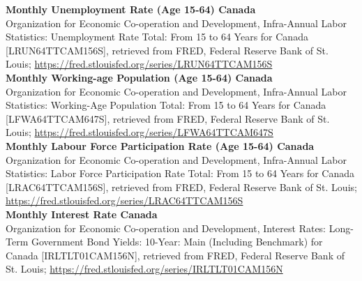 \documentclass[]{article}
\begin{document}
\noindent
\textbf{Monthly Unemployment Rate (Age 15-64) Canada}\\
\indent
Organization for Economic Co-operation and Development, Infra-Annual Labor Statistics: Unemployment Rate Total: From 15 to 64 Years for Canada [LRUN64TTCAM156S], retrieved from FRED, Federal Reserve Bank of St. Louis; \url{https://fred.stlouisfed.org/series/LRUN64TTCAM156S}\\


\noindent
\textbf{Monthly Working-age Population (Age 15-64) Canada}\\
\indent 
Organization for Economic Co-operation and Development, Infra-Annual Labor Statistics: Working-Age Population Total: From 15 to 64 Years for Canada [LFWA64TTCAM647S], retrieved from FRED, Federal Reserve Bank of St. Louis; \url{https://fred.stlouisfed.org/series/LFWA64TTCAM647S}\\

\noindent
\textbf{Monthly Labour Force Participation Rate (Age 15-64) Canada}\\
\indent
Organization for Economic Co-operation and Development, Infra-Annual Labor Statistics: Labor Force Participation Rate Total: From 15 to 64 Years for Canada [LRAC64TTCAM156S], retrieved from FRED, Federal Reserve Bank of St. Louis; \url{https://fred.stlouisfed.org/series/LRAC64TTCAM156S}\\

\noindent
\textbf{Monthly Interest Rate Canada}\\
\indent
Organization for Economic Co-operation and Development, Interest Rates: Long-Term Government Bond Yields: 10-Year: Main (Including Benchmark) for Canada [IRLTLT01CAM156N], retrieved from FRED, Federal Reserve Bank of St. Louis; \url{https://fred.stlouisfed.org/series/IRLTLT01CAM156N}
\end{document}

